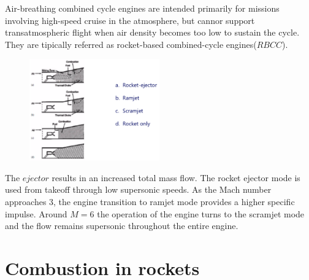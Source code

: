 \documentclass[12pt]{article}
\begin{document}
Air-breathing combined cycle engines are intended primarily for missions involving high-speed cruise in the atmosphere, but cannor support transatmospheric flight when air density becomes too low to sustain the cycle. They are tipically referred as rocket-based combined-cycle engines($\textit{RBCC}$).

\begin{figure}[!ht]
\centering
\includegraphics[width=0.5\textwidth]{figures/injector.png}
\end{figure}

The $\textit{ejector}$ results in an increased total mass flow. The rocket ejector mode is used from takeoff through low supersonic speeds. As the Mach number approaches 3, the engine transition to ramjet mode provides a higher specific impulse. Around $M=6$ the operation of the engine turns to the scramjet mode and the flow remains supersonic throughout the entire engine.

\newpage

\section{Combustion in rockets}
\end{document}
